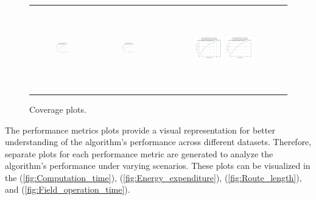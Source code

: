 \begin{figure}[p]
\begin{tabular}{ccc}
        \includegraphics[height=36mm,width=0.24\textwidth]{Images/simulation_no_obs/coverage_plots/51.png}
        & \includegraphics[height=36mm,width=0.24\textwidth]{Images/simulation_no_obs/coverage_plots/52.png}
        & \includegraphics[height=36mm,width=0.24\textwidth]{Images/simulation_no_obs/coverage_plots/53.png}
        \includegraphics[height=36mm,width=0.24\textwidth]{Images/simulation_no_obs/coverage_plots/54.png}\\[-4pt]

    \end{tabular}
    \caption{Coverage plots.\label{fig:coverage_plots}}
    \end{figure}


The performance metrics plots provide a visual representation for better understanding of the algorithm's performance across different datasets. Therefore, separate plots for each performance metric are generated to analyze the algorithm's performance under varying scenarios. These plots can be visualized in the (\autoref{fig:Computation_time}), (\autoref{fig:Energy_expenditure}), (\autoref{fig:Route_length}), and (\autoref{fig:Field_operation_time}).


